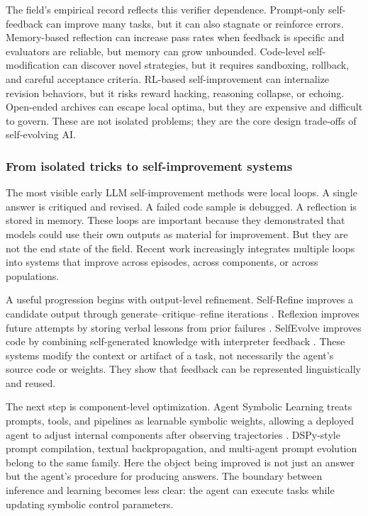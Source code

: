 The field's empirical record reflects this verifier dependence. Prompt-only self-feedback can improve many tasks, but it can also stagnate or reinforce errors. Memory-based reflection can increase pass rates when feedback is specific and evaluators are reliable, but memory can grow unbounded. Code-level self-modification can discover novel strategies, but it requires sandboxing, rollback, and careful acceptance criteria. RL-based self-improvement can internalize revision behaviors, but it risks reward hacking, reasoning collapse, or echoing. Open-ended archives can escape local optima, but they are expensive and difficult to govern. These are not isolated problems; they are the core design trade-offs of self-evolving AI.

\subsubsection{From isolated tricks to self-improvement systems}

The most visible early LLM self-improvement methods were local loops. A single answer is critiqued and revised. A failed code sample is debugged. A reflection is stored in memory. These loops are important because they demonstrated that models could use their own outputs as material for improvement. But they are not the end state of the field. Recent work increasingly integrates multiple loops into systems that improve across episodes, across components, or across populations.

A useful progression begins with output-level refinement. Self-Refine improves a candidate output through generate--critique--refine iterations \cite{selfrefine2023}. Reflexion improves future attempts by storing verbal lessons from prior failures \cite{reflexion2023}. SelfEvolve improves code by combining self-generated knowledge with interpreter feedback \cite{selfevolve2023}. These systems modify the context or artifact of a task, not necessarily the agent's source code or weights. They show that feedback can be represented linguistically and reused.

The next step is component-level optimization. Agent Symbolic Learning treats prompts, tools, and pipelines as learnable symbolic weights, allowing a deployed agent to adjust internal components after observing trajectories \cite{agentsymboliclearning2024}. DSPy-style prompt compilation, textual backpropagation, and multi-agent prompt evolution belong to the same family. Here the object being improved is not just an answer but the agent's procedure for producing answers. The boundary between inference and learning becomes less clear: the agent can execute tasks while updating symbolic control parameters.

